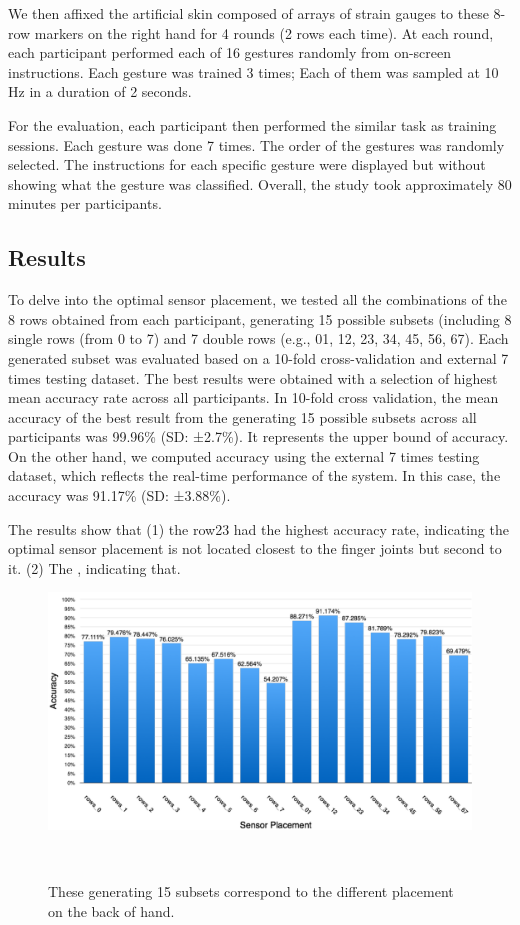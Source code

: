 \documentclass{sigchi}
\begin{document}
We then affixed the artificial skin composed of arrays of strain gauges to these 8-row markers on the right hand for 4 rounds (2 rows each time). 
At each round, each participant performed each of 16 gestures randomly from on-screen instructions. Each gesture was trained 3 times; Each of them was sampled at 10 Hz in a duration of 2 seconds.

For the evaluation, each participant then performed the similar task as training sessions. Each gesture was done 7 times. The order of the gestures was randomly selected. The instructions for each specific gesture were displayed but without showing what the gesture was classified. 
Overall, the study took approximately 80 minutes per participants.

\subsection{Results}
To delve into the optimal sensor placement, we tested all the combinations of the 8 rows obtained from each participant, generating 15 possible subsets (including 8 single rows (from 0 to 7) and 7 double rows (e.g., 01, 12, 23, 34, 45, 56, 67).
Each generated subset was evaluated based on a 10-fold cross-validation and external 7 times testing dataset.
The best results were obtained with a selection of highest mean accuracy rate across all participants.
In 10-fold cross validation, the mean accuracy of the best result from the generating 15 possible subsets across all participants was 99.96\% (SD: ±2.7\%).
It represents the upper bound of accuracy.
On the other hand, we computed accuracy using the external 7 times testing dataset, which reflects the real-time performance of the system.
In this case, the accuracy was 91.17\% (SD: ±3.88\%).

The results show that (1) the row23 had the highest accuracy rate, indicating the optimal sensor placement is not located closest to the finger joints but second to it. (2) The , indicating that.

\begin{figure}
 \begin{center}
  \includegraphics[width=2\columnwidth]{figures/accuracy16Gs.pdf}
  \caption{
    These generating 15 subsets correspond to the different placement on the back of hand.
  }~\label{fig:accuracy16Gs}
  \end{center}
\end{figure}
\end{document}
